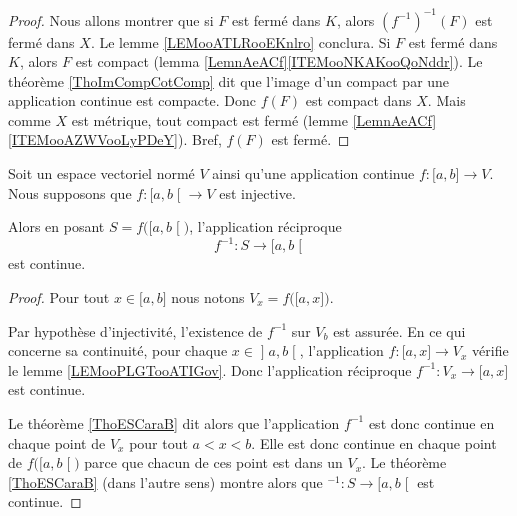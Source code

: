 \begin{proof}
	Nous allons montrer que si \( F\) est fermé dans \( K\), alors \( (f^{-1})^{-1}(F)\) est fermé dans \( X\). Le lemme \ref{LEMooATLRooEKnlro} conclura. Si \( F\) est fermé dans \( K\), alors \( F\) est compact (lemma \ref{LemnAeACf}\ref{ITEMooNKAKooQoNddr}). Le théorème \ref{ThoImCompCotComp} dit que l'image d'un compact par une application continue est compacte. Donc \( f(F)\) est compact dans \( X\). Mais comme \( X\) est métrique, tout compact est fermé (lemme \ref{LemnAeACf}\ref{ITEMooAZWVooLyPDeY}). Bref, \( f(F)\) est fermé.
\end{proof}

\begin{lemma}        \label{LEMooKSDKooDbKKeB}
	Soit un espace vectoriel normé \( V\) ainsi qu'une application continue \( f\colon \mathopen[ a , b \mathclose]\to V\). Nous supposons que \( f\colon \mathopen[ a , b \mathclose[\to V\) est injective.

	Alors en posant \( S=f\big( \mathopen[ a , b \mathclose[ \big)\), l'application réciproque
	\begin{equation}
		f^{-1}\colon S\to \mathopen[ a , b \mathclose[
	\end{equation}
	est continue.
\end{lemma}

\begin{proof}
	Pour tout \( x\in \mathopen[ a , b \mathclose]\) nous notons \( V_x=f\big( \mathopen[ a , x \mathclose] \big)\).

	Par hypothèse d'injectivité, l'existence de \( f^{-1}\) sur \( V_b\) est assurée. En ce qui concerne sa continuité, pour chaque \( x\in\mathopen] a , b \mathclose[\), l'application \( f\colon \mathopen[ a , x \mathclose]\to V_x\) vérifie le lemme \ref{LEMooPLGTooATIGov}. Donc l'application réciproque \( f^{-1}\colon V_x\to \mathopen[ a , x \mathclose]\) est continue.

	Le théorème \ref{ThoESCaraB} dit alors que l'application \( f^{-1}\) est donc continue en chaque point de \( V_x \) pour tout \( a<x<b\). Elle est donc continue en chaque point de \( f\big( \mathopen[ a , b \mathclose[ \big)\) parce que chacun de ces point est dans un \( V_x\). Le théorème \ref{ThoESCaraB}  (dans l'autre sens) montre alors que \( ^{-1}\colon S\to \mathopen[ a , b \mathclose[\) est continue.
\end{proof}


